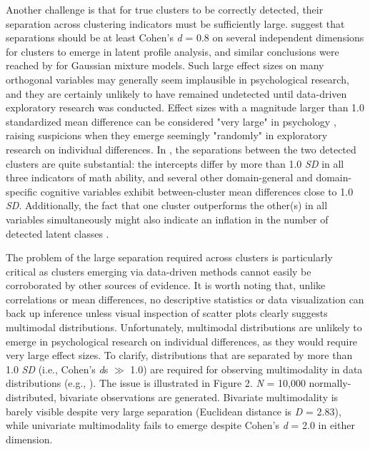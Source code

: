 \documentclass[letterpaper,11pt]{article}
\begin{document}
Another challenge is that for true clusters to be correctly detected, their separation across clustering indicators must be sufficiently large.  suggest that separations should be at least Cohen’s \textit{d} = 0.8 on several independent dimensions for clusters to emerge in latent profile analysis, and similar conclusions were reached by  for Gaussian mixture models. Such large effect sizes on many orthogonal variables may generally seem implausible in psychological research, and they are certainly unlikely to have remained undetected until data-driven exploratory research was conducted. Effect sizes with a magnitude larger than 1.0 standardized mean difference can be considered "very large" in psychology \cite{funder2019evaluating}, raising suspicions when they emerge seemingly "randomly" in exploratory research on individual differences. In , the separations between the two detected clusters are quite substantial: the intercepts differ by more than 1.0 \textit{SD} in all three indicators of math ability, and several other domain-general and domain-specific cognitive variables exhibit between-cluster mean differences close to 1.0 \textit{SD}. Additionally, the fact that one cluster outperforms the other(s) in all variables simultaneously might also indicate an inflation in the number of detected latent classes \cite{toffalini2022entia}.

The problem of the large separation required across clusters is particularly critical as clusters emerging via data-driven methods cannot easily be corroborated by other sources of evidence. It is worth noting that, unlike correlations or mean differences, no descriptive statistics or data visualization can back up inference unless visual inspection of scatter plots clearly suggests multimodal distributions. Unfortunately, multimodal distributions are unlikely to emerge in psychological research on individual differences, as they would require very large effect sizes. To clarify, distributions that are separated by more than 1.0 \textit{SD} (i.e., Cohen’s \textit{d}s $\gg$ 1.0) are required for observing multimodality in data distributions (e.g., ). The issue is illustrated in Figure 2. \textit{N} = 10,000 normally-distributed, bivariate observations are generated. Bivariate multimodality is barely visible despite very large separation (Euclidean distance is \textit{D} = 2.83), while univariate multimodality fails to emerge despite Cohen's \textit{d} = 2.0 in either dimension. 
\end{document}
